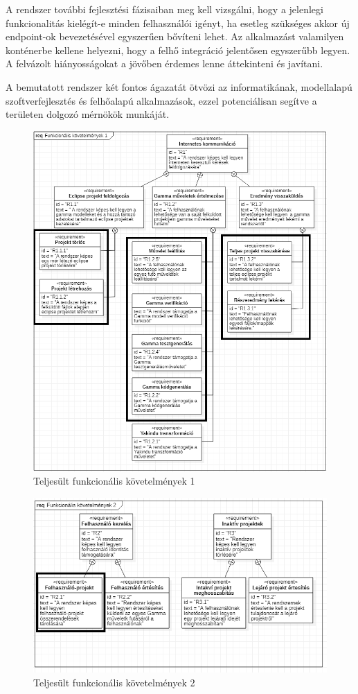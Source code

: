 A rendszer további fejlesztési fázisaiban meg kell vizsgálni, hogy a jelenlegi funkcionalitás kielégít-e minden felhasználói igényt, ha esetleg szükséges akkor új endpoint-ok bevezetésével egyszerűen bővíteni lehet. Az alkalmazást valamilyen konténerbe kellene helyezni, hogy a felhő integráció jelentősen egyszerűbb legyen. A felvázolt hiányosságokat a jövőben érdemes lenne áttekinteni és javítani.

A bemutatott rendszer két fontos ágazatát ötvözi az informatikának, modellalapú szoftverfejlesztés és felhőalapú alkalmazások, ezzel potenciálisan segítve a területen dolgozó mérnökök munkáját.
\begin{figure}[t]
	\includegraphics[width=\textwidth, keepaspectratio]{figures/requierments_placeholder_done.PNG}
	\caption{Teljesült funkcionális követelmények 1}
	\label{fig:requierments_placeholder_done}
\end{figure}
\begin{figure}[t]
	\includegraphics[width=\textwidth, keepaspectratio]{figures/requierments_2_done.PNG}
	\caption{Teljesült funkcionális követelmények 2}
	\label{fig:requierments_2_done}
\end{figure}
